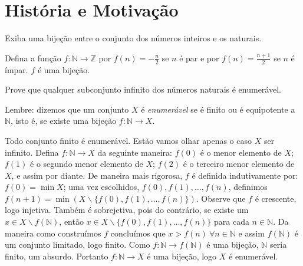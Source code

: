 \chapter{História e Motivação}

\begin{exercicio}
	Exiba uma bijeção entre o conjunto dos números inteiros e os naturais.
\end{exercicio}
\begin{solucao}
	Defina a função $f:\mathbb{N}\to\mathbb{Z}$ por $f(n)=-\frac{n}{2}$ se $n$ é par e por $f(n)=\frac{n+1}{2}$ se $n$ é ímpar. $f$ é uma bijeção.
\end{solucao}

\begin{exercicio}
	Prove que qualquer subconjunto infinito dos números naturais é enumerável.
\end{exercicio}
\begin{solucao}
	Lembre: dizemos que um conjunto $X$ é \textit{enumerável} se é finito ou é equipotente a $\mathbb{N}$, isto é, se existe uma bijeção $f:\mathbb{N}\to X$.
	
	Todo conjunto finito é enumerável. Estão vamos olhar apenas o caso $X$ ser infinito. Defina $f:\mathbb{N}\to X$ da seguinte maneira: $f(0)$ é o menor elemento de $X$; $f(1)$ é o segundo menor elemento de $X$; $f(2)$ é o terceiro menor elemento de $X$, e assim por diante. De maneira mais rigorosa, $f$ é definida indutivamente por: $f(0)=\min X$; uma vez escolhidos, $f(0),f(1),\ldots,f(n)$, definimos $f(n+1)=\min(X\backslash\{f(0),f(1),\ldots,f(n)\})$. Observe que $f$ é crescente, logo injetiva. Também é sobrejetiva, pois do contrário, se existe um $x\in X\backslash f(\mathbb{N})$, então $x\in X\backslash\{f(0),f(1),\ldots,f(n)\}$ para cada $n\in\mathbb{N}$. Da maneira como construímos $f$ concluímos que $x>f(n)\ \forall n\in\mathbb{N}$ e assim $f(\mathbb{N})$ é um conjunto limitado, logo finito. Como $f:\mathbb{N}\to f(\mathbb{N})$ é uma bijeção, $\mathbb{N}$ seria finito, um absurdo. Portanto $f:\mathbb{N}\to X$ é uma bijeção, logo $X$ é enumerável.
\end{solucao}


